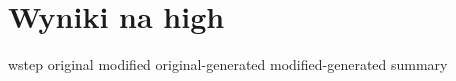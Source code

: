 \section{Wyniki na high}
{wstep}
{original}
{modified}
{original-generated}
{modified-generated}
{summary}

